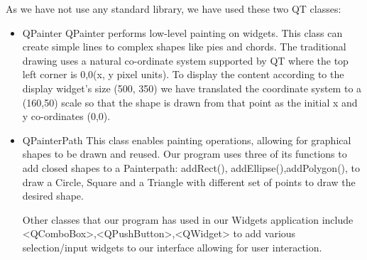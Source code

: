 \documentclass{article}
\begin{document}
As we have not use any standard library, we have used these two QT classes:
 \begin{itemize}
     \item QPainter \newline
     QPainter performs low-level painting on widgets. This class can create simple lines to complex shapes like pies and chords. The traditional drawing uses a natural co-ordinate system supported by QT where the top left corner is 0,0(x, y pixel units). To display the content according to the display widget’s size (500, 350) we have translated the coordinate system to a (160,50) scale so that the shape is drawn from that point as the initial x and y co-ordinates (0,0). 
     \item QPainterPath \newline
     This class enables painting operations, allowing for graphical shapes to be drawn and reused. Our program uses three of its functions to add closed shapes to a Painterpath: addRect(), addEllipse(),addPolygon(), to draw a Circle, Square and a Triangle with different set of points to draw the desired shape.
     
Other classes that our program has used in our Widgets application include <QComboBox>,<QPushButton>,<QWidget> to add various selection/input widgets to our interface allowing for user interaction. 

 \end{itemize}
 
\end{document}
